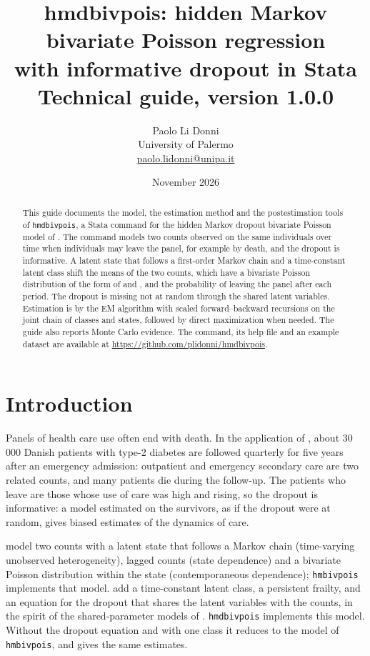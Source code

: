 \documentclass[11pt,a4paper]{article}
\title{\textbf{hmdbivpois}: hidden Markov bivariate Poisson regression\\ with informative dropout in Stata\\[0.4em]
\large Technical guide, version 1.0.0}
\author{Paolo Li Donni\\ University of Palermo\\ \href{mailto:paolo.lidonni@unipa.it}{paolo.lidonni@unipa.it}}
\date{November 2026}
\newcommand{\cmd}[1]{\texttt{#1}}
\begin{document}
\maketitle

\begin{abstract}
\noindent This guide documents the model, the estimation method and the postestimation tools of
\cmd{hmdbivpois}, a Stata command for the hidden Markov dropout bivariate Poisson model of
\citet{carrieri2026}. The command models two counts observed on the same individuals over time when
individuals may leave the panel, for example by death, and the dropout is informative. A latent state
that follows a first-order Markov chain and a time-constant latent class shift the means of the two
counts, which have a bivariate Poisson distribution of the form of \citet{lakshminarayana1999} and
\citet{famoye2010}, and the probability of leaving the panel after each period. The dropout is missing
not at random through the shared latent variables. Estimation is by the EM algorithm with scaled
forward--backward recursions on the joint chain of classes and states, followed by direct
maximization when needed. The guide also reports Monte Carlo evidence. The command, its help file and
an example dataset are available at \url{https://github.com/plidonni/hmdbivpois}.
\end{abstract}

\tableofcontents
\bigskip

\section{Introduction}

Panels of health care use often end with death. In the application of \citet{carrieri2026}, about
30\,000 Danish patients with type-2 diabetes are followed quarterly for five years after an emergency
admission: outpatient and emergency secondary care are two related counts, and many patients die
during the follow-up. The patients who leave are those whose use of care was high and rising, so the
dropout is informative: a model estimated on the survivors, as if the dropout were at random, gives
biased estimates of the dynamics of care.

\citet{laudicella2022} model two counts with a latent state that follows a Markov chain (time-varying
unobserved heterogeneity), lagged counts (state dependence) and a bivariate Poisson distribution
within the state (contemporaneous dependence); \cmd{hmbivpois} implements that model.
\citet{carrieri2026} add a time-constant latent class, a persistent frailty, and an equation for the
dropout that shares the latent variables with the counts, in the spirit of the shared-parameter models
of \citet{bartolucci2015}. \cmd{hmdbivpois} implements this model. Without the dropout equation and with
one class it reduces to the model of \cmd{hmbivpois}, and gives the same estimates.
\end{document}
